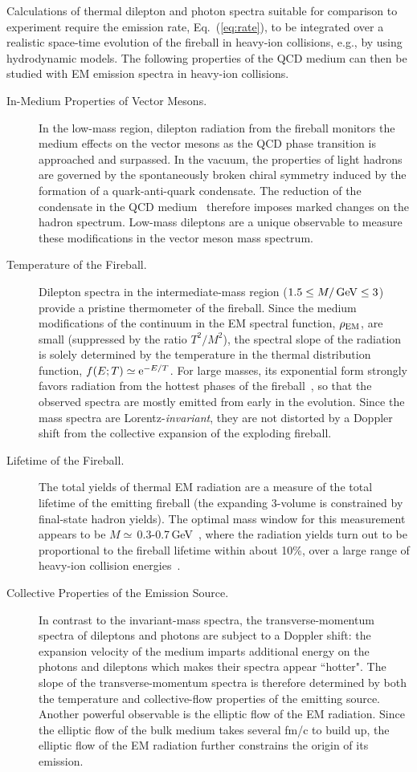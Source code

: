 Calculations of thermal dilepton and photon spectra suitable for comparison to
experiment require the emission rate, Eq.~(\ref{eq:rate}), to be integrated over a
realistic space-time evolution of the fireball in heavy-ion collisions, e.g., by
using hydrodynamic models. The following properties of the QCD medium can then be
studied with EM emission spectra in heavy-ion collisions.
\begin{description}
\item[In-Medium Properties of Vector Mesons.]
In the low-mass region, dilepton radiation from the fireball monitors the
medium effects on the vector mesons as the QCD phase transition is approached and
surpassed. In the vacuum, the properties of light hadrons are governed by the
spontaneously broken chiral symmetry induced by the formation of a quark-anti-quark
condensate. The reduction of the condensate in the QCD medium~\cite{Borsanyi:2010bp}
therefore imposes marked changes on the hadron spectrum. Low-mass dileptons are a
unique observable to measure these modifications in the vector meson mass spectrum.
\item[Temperature of the Fireball.]
Dilepton spectra in the intermediate-mass region\linebreak
($1.5 \le M/\,\mathrm{GeV} \le 3$) provide a
pristine thermometer of the fireball. Since the medium modifications of the continuum
in the EM spectral function, $\rho_{\rm EM}$, are small (suppressed by the ratio
$T^2/M^2$), the spectral slope of the radiation is solely determined by the temperature
in the thermal distribution function, $f(E;T)\simeq{\rm e}^{-E/T}$. For large masses,
its exponential form strongly favors radiation from the hottest phases of the
fireball~\cite{Shuryak:1980tp,Rapp:2004zh}, so that the observed spectra are mostly
emitted from early in the evolution. Since the mass spectra are
Lorentz-{\em invariant}, they are not distorted by a Doppler shift
from the collective expansion of the exploding fireball.
\item[Lifetime of the Fireball.]
The total yields of thermal EM radiation are a measure of the total lifetime of the
emitting fireball (the expanding 3-volume is constrained by final-state hadron yields).
The optimal mass window for this measurement appears to be
$M\simeq$\,0.3-0.7\,GeV~\cite{Rapp:2014hha}, where the radiation yields turn out to
be proportional to the fireball lifetime within about 10\%,
over a large range of heavy-ion collision energies~\cite{Rapp:2014hha}.
\item[Collective Properties of the Emission Source.]
In contrast to the invariant-mass spectra, the transverse-momentum spectra of dileptons
and photons are subject to a Doppler shift: the expansion velocity of the medium
imparts additional energy on the photons and dileptons which makes their spectra appear
``hotter". The slope of the transverse-momentum spectra is therefore determined by both
the temperature and collective-flow properties of the emitting source.
Another powerful observable is the elliptic flow of the EM radiation. Since the elliptic
flow of the bulk medium takes several fm/c to build up, the elliptic flow of the EM
radiation further constrains the origin of its emission.
\end{description}

